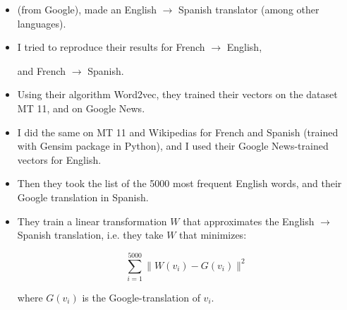 \documentclass{beamer}
\begin{document}
\begin{frame}
\begin{itemize}
\item \cite{mikolov132} (from Google), made an English $\rightarrow$ Spanish translator (among other languages). 

\item I tried to reproduce their results for French $\rightarrow$ English, 

and French $\rightarrow$ Spanish.

\item Using their algorithm Word2vec, they trained their vectors on the dataset MT 11, and on Google News.

\item I did the same on MT 11 and Wikipedias for French and Spanish (trained with Gensim package in Python), and I used their Google News-trained vectors for English.

\end{itemize} 
 
\end{frame}

\begin{frame}

\begin{itemize}

\item Then they took the list of the 5000 most frequent English words, and their Google translation in Spanish.

\item They train a linear transformation $W$ that approximates the English $\rightarrow$ Spanish translation, i.e. they take $W$ that minimizes:

\[  \sum_{i=1}^{5000} \| W(v_i) - G(v_i)  \|^2 \]

where $G(v_i)$ is the Google-translation of $v_i$.


\end{itemize}

\end{frame}
\end{document}

